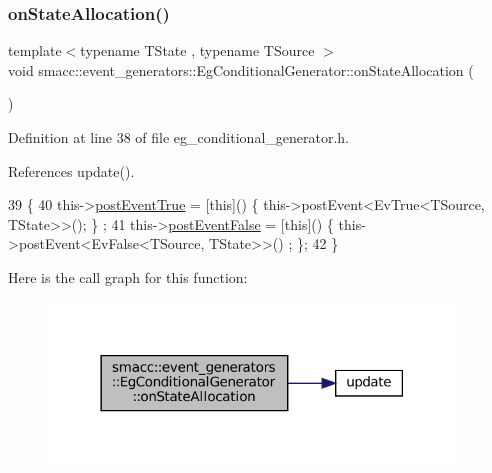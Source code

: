 \subsubsection{\texorpdfstring{on\+State\+Allocation()}{onStateAllocation()}}
{\footnotesize\ttfamily template$<$typename T\+State , typename T\+Source $>$ \\
void smacc\+::event\+\_\+generators\+::\+Eg\+Conditional\+Generator\+::on\+State\+Allocation (\begin{DoxyParamCaption}{ }\end{DoxyParamCaption})\hspace{0.3cm}{\ttfamily [inline]}}



Definition at line 38 of file eg\+\_\+conditional\+\_\+generator.\+h.



References update().


\begin{DoxyCode}
39             \{
40                 this->\hyperlink{classsmacc_1_1event__generators_1_1EgConditionalGenerator_a888c44b5585274947b57143611a8670d}{postEventTrue} = [\textcolor{keyword}{this}]() \{ this->postEvent<EvTrue<TSource, TState>>(); \}
      ;
41                 this->\hyperlink{classsmacc_1_1event__generators_1_1EgConditionalGenerator_ac45d7b197cc4cf361602c72dc85ed62a}{postEventFalse} = [\textcolor{keyword}{this}]() \{ this->postEvent<EvFalse<TSource, TState>>()
      ; \};
42             \}
\end{DoxyCode}
Here is the call graph for this function\+:
\nopagebreak
\begin{figure}[H]
\begin{center}
\leavevmode
\includegraphics[width=306pt]{classsmacc_1_1event__generators_1_1EgConditionalGenerator_a08e70fdc7797e05189357286106d267d_cgraph}
\end{center}
\end{figure}
\mbox{\label{classsmacc_1_1event__generators_1_1EgConditionalGenerator_a511e3afee28721cf1bd632bf9140003d}} 
